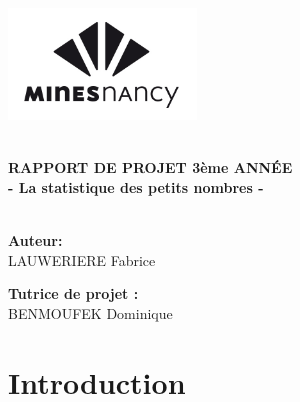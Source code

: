 \documentclass[a4paper, 11pt]{article}
\begin{document}

\begin{titlepage}
\includegraphics[width=5cm]{images/logo_mines.jpg}
\vspace{6cm}
\begin{center}
\hrulefill\\
{\LARGE \textbf{RAPPORT DE PROJET 3ème ANNÉE\\ - La statistique des petits nombres -\\}}
\hrulefill\\
\vspace{1cm}
\vspace{2cm}

\begin{minipage}{5cm}
\begin{center}
\textbf{Auteur:}\\
LAUWERIERE Fabrice
\end{center}
\end{minipage}
\hspace{1cm}
\begin{minipage}{5cm}
\begin{center}
\textbf{Tutrice de projet :}\\
BENMOUFEK Dominique
\end{center}
\end{minipage}
\end{center}
\end{titlepage} 

\tableofcontents
\pagestyle{headings}
\newpage
\section*{{\LARGE Introduction}}
\vspace{1cm}
\end{document}
